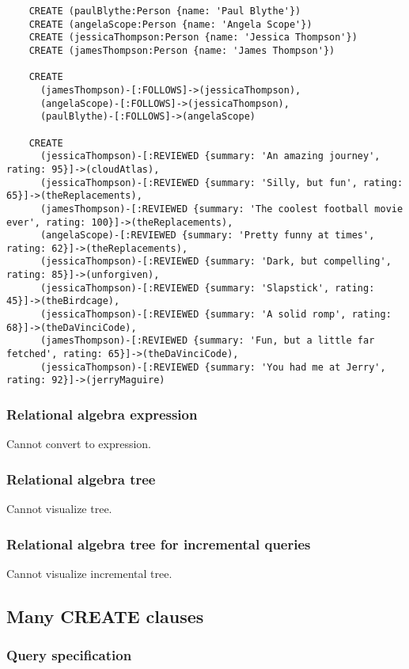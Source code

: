 \begin{lstlisting}
	CREATE (paulBlythe:Person {name: 'Paul Blythe'})
	CREATE (angelaScope:Person {name: 'Angela Scope'})
	CREATE (jessicaThompson:Person {name: 'Jessica Thompson'})
	CREATE (jamesThompson:Person {name: 'James Thompson'})
	
	CREATE
	  (jamesThompson)-[:FOLLOWS]->(jessicaThompson),
	  (angelaScope)-[:FOLLOWS]->(jessicaThompson),
	  (paulBlythe)-[:FOLLOWS]->(angelaScope)
	
	CREATE
	  (jessicaThompson)-[:REVIEWED {summary: 'An amazing journey', rating: 95}]->(cloudAtlas),
	  (jessicaThompson)-[:REVIEWED {summary: 'Silly, but fun', rating: 65}]->(theReplacements),
	  (jamesThompson)-[:REVIEWED {summary: 'The coolest football movie ever', rating: 100}]->(theReplacements),
	  (angelaScope)-[:REVIEWED {summary: 'Pretty funny at times', rating: 62}]->(theReplacements),
	  (jessicaThompson)-[:REVIEWED {summary: 'Dark, but compelling', rating: 85}]->(unforgiven),
	  (jessicaThompson)-[:REVIEWED {summary: 'Slapstick', rating: 45}]->(theBirdcage),
	  (jessicaThompson)-[:REVIEWED {summary: 'A solid romp', rating: 68}]->(theDaVinciCode),
	  (jamesThompson)-[:REVIEWED {summary: 'Fun, but a little far fetched', rating: 65}]->(theDaVinciCode),
	  (jessicaThompson)-[:REVIEWED {summary: 'You had me at Jerry', rating: 92}]->(jerryMaguire)
	\end{lstlisting}


	\subsubsection*{Relational algebra expression}

	Cannot convert to expression.

	\subsubsection*{Relational algebra tree}

	Cannot visualize tree.

	\subsubsection*{Relational algebra tree for incremental queries}

	Cannot visualize incremental tree.
	\subsection{Many CREATE clauses}

	\subsubsection*{Query specification}

